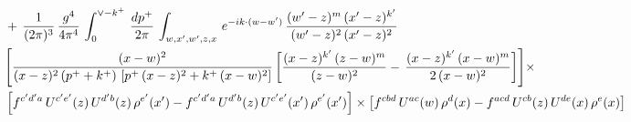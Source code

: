 \documentclass[9pt]{article}
\numberwithin{equation}{section}
\begin{document}
{\begin{align*}
&  +\,\frac{1}{(2\pi)^{3}}\,\frac{g^{4}}{4\pi^{4}}\,\int_{0}^{\vee - k^{+}}\, \frac{dp^{+}}{2\pi}\,\int_{w,x',w',z,x}\, e^{-ik\cdot (w-w')}\, \frac{(w'-z)^{m}\,(x'-z)^{k'}}{(w'-z)^{2}\,(x'-z)^{2}}\, \notag \\ &  \Bigg[ \frac{(x-w)^{2}}{(x-z)^{2}\,(p^{+}+k^{+})\,\left[p^{+}\,(x-z)^{2}+k^{+}\,(x-w)^{2}\right]}\,\bigg[\frac{(x-z)^{k'}\,(z-w)^{m}}{(z-w)^{2}} -\,\frac{(x-z)^{k'}\,(x-w)^{m}}{2\,(x-w)^{2}}\bigg] \Bigg]\times\,\notag \\ & \left[f^{c'd'a}\,U^{c'e'}(z)\,U^{d'b}(z)\,\rho^{e'}(x')-f^{c'd'a}\, 
    U^{d'b}(z)\,U^{c'e'}(x')\,\rho^{e'}(x')\right]\times \left[f^{cbd}\,U^{ac}(w)\,\rho^{d}(x) -f^{acd}\,U^{cb}(z)\,U^{de}(x)\,\rho^{e}(x)\right]
\end{align*}
}\par
\end{document}
